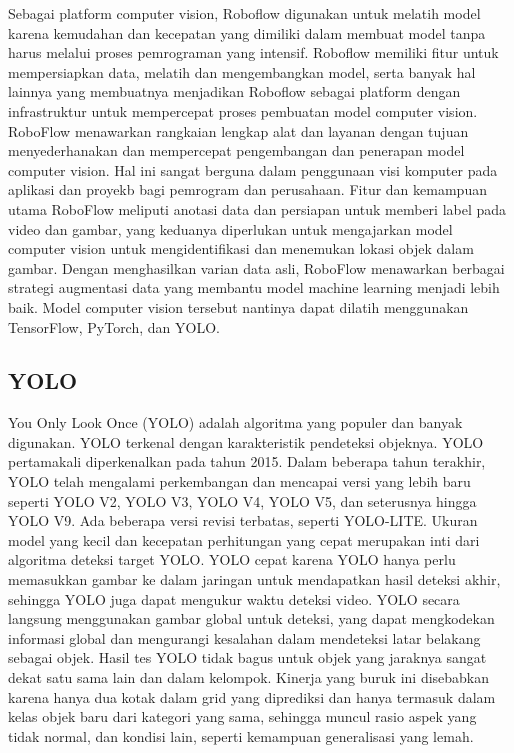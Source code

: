 Sebagai platform computer vision, Roboflow digunakan untuk melatih model karena kemudahan dan kecepatan yang dimiliki dalam membuat model tanpa harus melalui proses pemrograman yang intensif. Roboflow memiliki fitur untuk mempersiapkan data, melatih dan mengembangkan model, serta banyak hal lainnya yang membuatnya menjadikan Roboflow sebagai platform dengan infrastruktur untuk mempercepat proses pembuatan model computer vision. RoboFlow menawarkan rangkaian lengkap alat dan layanan dengan tujuan menyederhanakan dan mempercepat pengembangan dan penerapan model computer vision. Hal ini sangat berguna dalam penggunaan visi komputer pada aplikasi dan proyekb bagi pemrogram dan perusahaan. Fitur dan kemampuan utama RoboFlow meliputi anotasi data dan persiapan untuk memberi label pada video dan gambar, yang keduanya diperlukan untuk mengajarkan model computer vision untuk mengidentifikasi dan menemukan lokasi objek dalam gambar. Dengan menghasilkan varian data asli, RoboFlow menawarkan berbagai strategi augmentasi data yang membantu model machine learning menjadi lebih baik. Model computer vision tersebut nantinya dapat dilatih menggunakan TensorFlow, PyTorch, dan YOLO\parencite{Brucal2023}.

\subsection{YOLO}
You Only Look Once (YOLO) adalah algoritma yang populer dan banyak digunakan. YOLO terkenal dengan karakteristik pendeteksi objeknya. YOLO pertamakali diperkenalkan pada tahun 2015. Dalam beberapa tahun terakhir, YOLO telah mengalami perkembangan dan mencapai versi yang lebih baru seperti YOLO V2, YOLO V3, YOLO V4, YOLO V5, dan seterusnya hingga YOLO V9. Ada beberapa versi revisi terbatas, seperti YOLO-LITE. Ukuran model yang kecil dan kecepatan perhitungan yang cepat merupakan inti dari algoritma deteksi target YOLO. YOLO cepat karena YOLO hanya perlu memasukkan gambar ke dalam jaringan untuk mendapatkan hasil deteksi akhir, sehingga YOLO juga dapat mengukur waktu deteksi video. YOLO secara langsung menggunakan gambar global untuk deteksi, yang dapat mengkodekan informasi global dan mengurangi kesalahan dalam mendeteksi latar belakang sebagai objek. Hasil tes YOLO tidak bagus untuk objek yang jaraknya sangat dekat satu sama lain dan dalam kelompok. Kinerja yang buruk ini disebabkan karena hanya dua kotak dalam grid yang diprediksi dan hanya termasuk dalam kelas objek baru dari kategori yang sama, sehingga muncul rasio aspek yang tidak normal, dan kondisi lain, seperti kemampuan generalisasi yang lemah\parencite{Jiang2022}.

